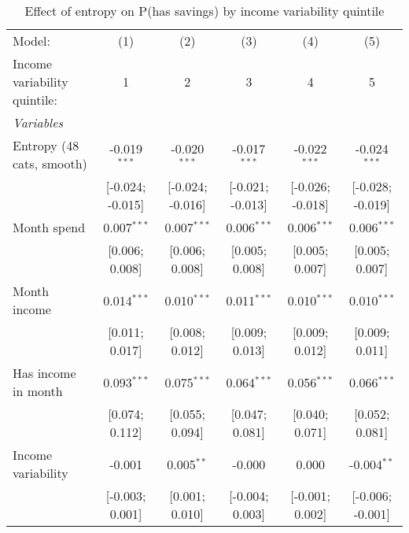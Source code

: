 
\begin{table}[htbp]
   \centering
   \tiny
   \begin{threeparttable}[b]
      \caption{\label{tab:reg_has_inflows_entropy_tag_spend_sz_inc_var_quint} Effect of entropy on P(has savings) by income variability quintile}
      \begin{tabular}{lccccc}
         \tabularnewline \midrule \midrule
         Model:                       & (1)              & (2)              & (3)              & (4)              & (5)\\  
         Income variability quintile: & 1                & 2                & 3                & 4                & 5 \\   
         \midrule
         \emph{Variables}\\
         Entropy (48 cats, smooth)    & -0.019$^{***}$   & -0.020$^{***}$   & -0.017$^{***}$   & -0.022$^{***}$   & -0.024$^{***}$\\   
                                      & [-0.024; -0.015] & [-0.024; -0.016] & [-0.021; -0.013] & [-0.026; -0.018] & [-0.028; -0.019]\\   
         Month spend                  & 0.007$^{***}$    & 0.007$^{***}$    & 0.006$^{***}$    & 0.006$^{***}$    & 0.006$^{***}$\\   
                                      & [0.006; 0.008]   & [0.006; 0.008]   & [0.005; 0.008]   & [0.005; 0.007]   & [0.005; 0.007]\\   
         Month income                 & 0.014$^{***}$    & 0.010$^{***}$    & 0.011$^{***}$    & 0.010$^{***}$    & 0.010$^{***}$\\   
                                      & [0.011; 0.017]   & [0.008; 0.012]   & [0.009; 0.013]   & [0.009; 0.012]   & [0.009; 0.011]\\   
         Has income in month          & 0.093$^{***}$    & 0.075$^{***}$    & 0.064$^{***}$    & 0.056$^{***}$    & 0.066$^{***}$\\   
                                      & [0.074; 0.112]   & [0.055; 0.094]   & [0.047; 0.081]   & [0.040; 0.071]   & [0.052; 0.081]\\   
         Income variability           & -0.001           & 0.005$^{**}$     & -0.000           & 0.000            & -0.004$^{**}$\\   
                                      & [-0.003; 0.001]  & [0.001; 0.010]   & [-0.004; 0.003]  & [-0.001; 0.002]  & [-0.006; -0.001]\\   
         \midrule

\end{tabular}
\end{threeparttable}
\end{table}

